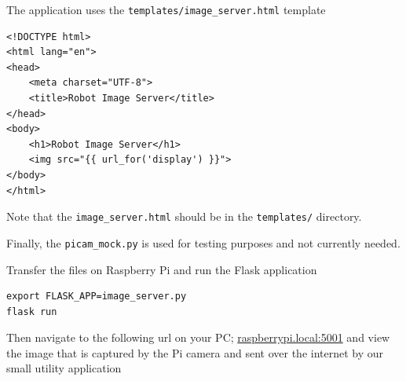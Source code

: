 The application uses the \lstinline{templates/image_server.html} template

\begin{lstlisting}
<!DOCTYPE html>
<html lang="en">
<head>
    <meta charset="UTF-8">
    <title>Robot Image Server</title>
</head>
<body>
    <h1>Robot Image Server</h1>
    <img src="{{ url_for('display') }}">
</body>
</html>
\end{lstlisting}


\begin{framed}
\begin{remark}

Note that the \lstinline{image_server.html} should be in the \lstinline{templates/} directory.
\end{remark}
\end{framed}

Finally, the \lstinline{picam_mock.py} is used for testing purposes and not currently needed.

Transfer the files on Raspberry Pi and  run the Flask application

\begin{lstlisting}
export FLASK_APP=image_server.py
flask run
\end{lstlisting}

Then navigate to the following url on your PC; \url{raspberrypi.local:5001} and view the image that is captured by the Pi camera and sent
over the internet by our small utility application
 





